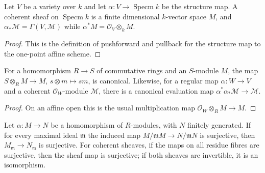 \begin{lemma}
\label{lem:milne-5-9}

Let $V$ be a variety over $k$ and let $\alpha:V\to\operatorname{Specm}k$ be
the structure map.  A coherent sheaf on $\operatorname{Specm}k$ is a finite
dimensional $k$-vector space $M$, and $\alpha_*\mathcal M=\Gamma(V,\mathcal
M)$ while $\alpha^*M=\mathcal O_V\otimes_k M$.
\end{lemma}

\begin{proof}

This is the definition of pushforward and pullback for the structure map to
the one-point affine scheme.

\end{proof}


\begin{lemma}
\label{lem:milne-5-10}

\leanok
For a homomorphism $R\to S$ of commutative rings and an $S$-module $M$, the
map $S\otimes_RM\to M$, $s\otimes m\mapsto sm$, is canonical.  Likewise,
for a regular map $\alpha:W\to V$ and a coherent $\mathcal O_W$-module
$\mathcal M$, there is a canonical evaluation map
$\alpha^*\alpha_*\mathcal M\to\mathcal M$.
\end{lemma}

\begin{proof}
\leanok
On an affine open this is the usual multiplication map
$\mathcal O_W\otimes_R M\to M$.
\end{proof}

\begin{lemma}
\label{lem:milne-5-11}

Let $\alpha:M\to N$ be a homomorphism of $R$-modules, with $N$ finitely
generated.  If for every maximal ideal $\mathfrak m$ the induced map
$M/\mathfrak mM\to N/\mathfrak mN$ is surjective, then
$M_\mathfrak m\to N_\mathfrak m$ is surjective.  For coherent sheaves, if
the maps on all residue fibres are surjective, then the sheaf map is
surjective; if both sheaves are invertible, it is an isomorphism.
\end{lemma}


